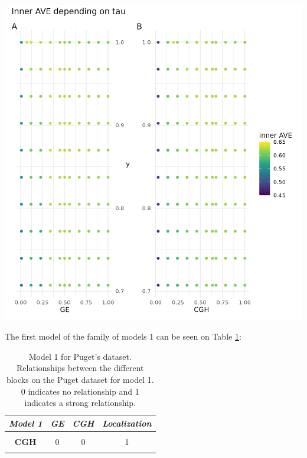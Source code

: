 \documentclass[
  12pt,
  a4paper,
  twoside,
  openright]{book}
\let\origfigure\figure
\let\endorigfigure\endfigure
\renewenvironment{figure}[1][2] {
    \expandafter\origfigure\expandafter[!htp]
} {
    \endorigfigure
}
\begin{document}
\begin{figure}
\includegraphics[width=1\linewidth]{images/pugets_tau_to_AVE} \caption[Effect of tau on the inner AVE on Puget's dataset.]{Effect of tau on the inner AVE on Puget's dataset. The suggested tau value is the column between the regular grid, on the ordinate axis the y's tau values and on the abscissa the gene expression (GE) on the left and the comparative genomic hybridization (CGH) on the right. The highest inner AVE is with high tau values for y and middle to upper values for GE and CGH.}\label{fig:puget-tau2AVE}
\end{figure}

The first model of the family of models 1 can be seen on Table \ref{tab:puget-model1}:

\begin{table}[H]

\caption[Model 1 for Puget's dataset.]{\label{tab:puget-model1}Model 1 for Puget's dataset. Relationships between the different blocks on the Puget dataset for model 1. 0 indicates no relationship and 1 indicates a strong relationship.}
\centering
\begin{tabular}[t]{|>{}c|c|c|>{}c|}
\hline
\em{\textbf{Model 1}} & \em{\textbf{GE}} & \em{\textbf{CGH}} & \em{\textbf{Localization}}\\
\hline
\textbf{\cellcolor{gray!6}{GE}} & \cellcolor{gray!6}{0} & \cellcolor{gray!6}{0} & \cellcolor{gray!6}{1}\\
\hline
\textbf{CGH} & 0 & 0 & 1\\
\hline
\textbf{\cellcolor{gray!6}{Localization}} & \cellcolor{gray!6}{1} & \cellcolor{gray!6}{1} & \cellcolor{gray!6}{0}\\
\hline
\end{tabular}
\end{table}
\end{document}
